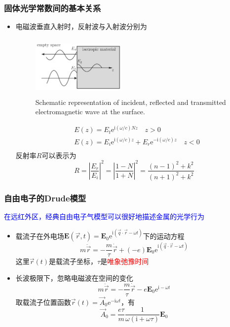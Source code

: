 \documentclass[cjk,slidestop,compress,mathserif,blue]{beamer}
\begin{document}
\frame
{
	\frametitle{固体光学常数间的基本关系}
	\begin{itemize}
		\item 电磁波垂直入射时，反射波与入射波分别为
\begin{figure}[h!]
\centering
\vspace*{-0.4in}
\includegraphics[height=1.2in,width=1.8in,viewport=0 0 750 600,clip]{Figures/Optic-reflect.png}
\caption{\tiny \textrm{Schematic representation of incident, reflected and transmitted electromagnetic wave at the surface.}}%
\label{Optic-reflect}
\end{figure} 
			\begin{displaymath}
				\begin{aligned}
					&E(z)=E_t\mathrm{e}^{\mathrm{i}(\omega/c)Nz}\quad z>0\\
					&E(z)=E_i\mathrm{e}^{\mathrm{i}(\omega/c)z}+E_r\mathrm{e}^{-\mathrm{i}(\omega/c)z}\quad z<0\\
				\end{aligned}
			\end{displaymath}
			反射率$R$可以表示为
			\begin{displaymath}
				R=\left|\frac{E_r}{E_i}\right|^2=\left|\frac{1-N}{1+N}\right|^2=\frac{(n-1)^2+k^2}{(n+1)^2+k^2}
			\end{displaymath}
	\end{itemize}
}

\frame
{
	\frametitle{自由电子的\textrm{Drude}模型}
	\textcolor{blue}{在远红外区，经典自由电子气模型可以很好地描述金属的光学行为}
	\begin{itemize}
		\item 载流子在外电场$\mathbf{E}(\vec r,t)=\mathbf{E}_0\mathrm{e}^{\mathrm{i}(\vec q\cdot\vec r-\omega t)}$下的运动方程
			\begin{displaymath}
				m\ddot{\vec r}=-\frac m{\tau}\dot{\vec r}+(-e)\mathbf{E}_0\mathrm{e}^{\mathrm{i}(\vec q\cdot\vec r-\omega t)}
			\end{displaymath}
			这里$\vec r(t)$是载流子坐标，$\tau$是\textcolor{red}{唯象弛豫时间}
		\item 长波极限下，忽略电磁波在空间的变化
			\begin{displaymath}
				m\ddot{\vec r}=-\frac m{\tau}\dot{\vec r}-e\mathbf{E}_0\mathrm{e}^{\mathrm{i}-\omega t}
			\end{displaymath}
			取载流子位置函数$\vec r(t)=\vec A_0\mathrm{e}^{-\mathrm{i}\omega t}$，有
			\begin{displaymath}
				\vec A_0=\frac{e\tau}m\frac1{\omega(\mathrm{i}+\omega\tau)}\mathbf{E}_0
			\end{displaymath}
	\end{itemize}
}
\end{document}
